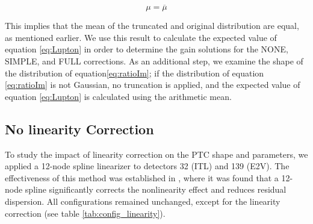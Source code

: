 \begin{itemize}
    \begin{equation}
        \mu = \overline{\mu}
        \label{eq:truncated_dist_simetric}
    \end{equation}

    This implies that the mean of the truncated and original distribution are equal, as mentioned earlier. We use this result to calculate the expected value of equation \ref{eq:Lupton} in order to determine the gain solutions for the NONE, SIMPLE, and FULL corrections. As an additional step, we examine the shape of the distribution of equation\ref{eq:ratioIm}; if the distribution of equation \ref{eq:ratioIm} is not Gaussian, no truncation is applied, and the expected value of equation \ref{eq:Lupton} is calculated using the arithmetic mean.

\end{itemize}


\subsection{No linearity Correction} \label{subsec:method_Linearity}

To study the impact of linearity correction on the PTC shape and parameters, we applied a 12-node spline linearizer to detectors 32 (ITL) and 139 (E2V). The effectiveness of this method was established in , where it was found that a 12-node spline significantly corrects the nonlinearity effect and reduces residual dispersion. All configurations remained unchanged, except for the linearity correction (see table \ref{tab:config_linearity}).


\begin{table}[!htb]
\centering
\caption{The configuration used to generate the PTCs when we include the linearity correction (the parameter 'doLinearize' is set to 'true').}
\label{tab:config_linearity}
\end{table}


